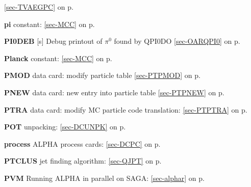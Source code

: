  \ref{sec-TVAEGPC} on p.~\pageref{sec-TVAEGPC}\\
 \item{\bf pi      }constant: \ref{sec-MCC} on p.~\pageref{sec-MCC}\\
 \item{\bf PI0DEB  }[s] Debug printout of $\pi^0$ found by QPI0DO
 \ref{sec-OARQPI0} on p.~\pageref{sec-OARQPI0}\\
 \item{\bf Planck  }constant: \ref{sec-MCC} on p.~\pageref{sec-MCC}\\
 \item{\bf PMOD    }data card: modify particle table \ref{sec-PTPMOD} on p.~\pageref{sec-PTPMOD}\\
 \item{\bf PNEW    }data card: new entry into particle table \ref{sec-PTPNEW}
 on p.~\pageref{sec-PTPNEW}\\
 \item{\bf PTRA    }data card: modify MC particle code translation:
 \ref{sec-PTPTRA} on p.~\pageref{sec-PTPTRA}\\
 \item{\bf POT     }unpacking: \ref{sec-DCUNPK} on p.~\pageref{sec-DCUNPK}\\
 \item{\bf process }ALPHA process cards: \ref{sec-DCPC} on p.~\pageref{sec-DCPC}\\
 \item{\bf PTCLUS }jet finding algorithm: \ref{sec-QJPT} on p.~\pageref{sec-QJPT}\\
 \item{\bf PVM    }Running ALPHA in parallel on SAGA: \ref{sec-alphar} on p.~\pageref{sec-alphar}
 
